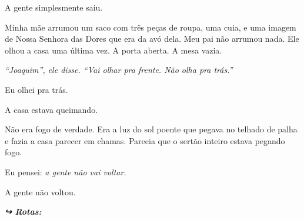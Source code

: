 \noindent A gente simplesmente saiu.

\noindent Minha mãe arrumou um saco com três peças de roupa, uma cuia, e uma imagem de Nossa Senhora das Dores que era da avó dela. Meu pai não arrumou nada. Ele olhou a casa uma última vez. A porta aberta. A mesa vazia.

\noindent \textit{\textquotedblleft{}Joaquim\textquotedblright{}\textit{, ele disse. }\textquotedblleft{}Vai olhar pra frente. Não olha pra trás.\textquotedblright{}}

\noindent Eu olhei pra trás.

\noindent A casa estava queimando.

\noindent Não era fogo de verdade. Era a luz do sol poente que pegava no telhado de palha e fazia a casa parecer em chamas. Parecia que o sertão inteiro estava pegando fogo.

\noindent Eu pensei: \textit{a gente não vai voltar.}

\noindent A gente não voltou.

\vspace{0.5em}
\noindent\textit{\textbf{↪ Rotas:}  \rotasep {}}